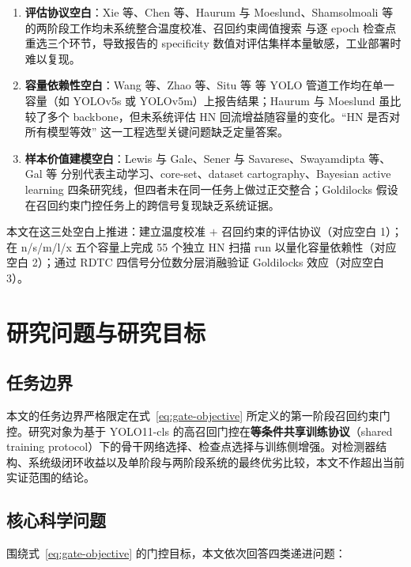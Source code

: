 \documentclass[UTF8,openany,12pt]{ctexbook}
\begin{document}
\begin{enumerate}[leftmargin=2em,nosep]
\item \textbf{评估协议空白}：Xie 等\cite{xie2019hierarchical}、Chen 等\cite{chen2018intelligent}、Haurum 与 Moeslund\cite{haurum2021sewerml}、Shamsolmoali 等\cite{shamsolmoali2025twostage} 的两阶段工作均未系统整合温度校准\cite{guo2017calibration}、召回约束阈值搜索\cite{kumar2021constrained} 与逐 epoch 检查点重选三个环节，导致报告的 specificity 数值对评估集样本量敏感，工业部署时难以复现。
\item \textbf{容量依赖性空白}：Wang 等\cite{wang2023improvedyolov5}、Zhao 等\cite{zhao2024yolov5sewer}、Situ 等\cite{situ2023transfer} 等 YOLO 管道工作均在单一容量（如 YOLOv5s 或 YOLOv5m）上报告结果；Haurum 与 Moeslund\cite{haurum2021sewerml} 虽比较了多个 backbone，但未系统评估 HN 回流增益随容量的变化。``HN 是否对所有模型等效'' 这一工程选型关键问题缺乏定量答案。
\item \textbf{样本价值建模空白}：Lewis 与 Gale\cite{lewis1994sequential}、Sener 与 Savarese\cite{sener2018active}、Swayamdipta 等\cite{swayamdipta2020cartography}、Gal 等\cite{gal2017deep} 分别代表主动学习、core-set、dataset cartography、Bayesian active learning 四条研究线，但四者未在同一任务上做过正交整合；Goldilocks 假设\cite{swayamdipta2020cartography}在召回约束门控任务上的跨信号复现缺乏系统证据。
\end{enumerate}

本文在这三处空白上推进：建立温度校准 $+$ 召回约束的评估协议（对应空白 1）；在 n/s/m/l/x 五个容量上完成 55 个独立 HN 扫描 run 以量化容量依赖性（对应空白 2）；通过 RDTC 四信号分位数分层消融验证 Goldilocks 效应（对应空白 3）。

\section{研究问题与研究目标}
\subsection{任务边界}
本文的任务边界严格限定在式~\eqref{eq:gate-objective} 所定义的第一阶段召回约束门控。研究对象为基于 YOLO11-cls 的高召回门控在\textbf{等条件共享训练协议}（shared training protocol）下的骨干网络选择、检查点选择与训练侧增强。对检测器结构、系统级闭环收益以及单阶段与两阶段系统的最终优劣比较，本文不作超出当前实证范围的结论。

\subsection{核心科学问题}
围绕式~\eqref{eq:gate-objective} 的门控目标，本文依次回答四类递进问题：
\end{document}

